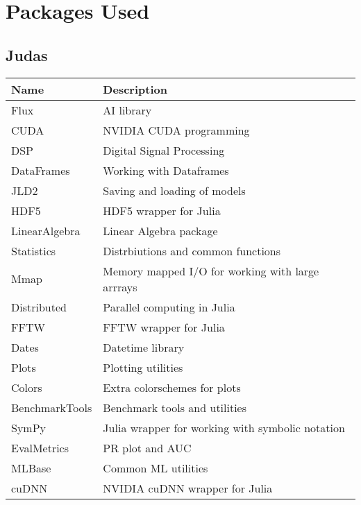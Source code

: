 \chapter{Packages Used}
\label{app:packages}

\section{Judas}
\label{app:jupacks}

\begin{table}[h]
\begin{tabular}{|l|l|}
\hline
\textbf{Name}  & \textbf{Description}                             \\ \hline
Flux           & AI library                                       \\ \hline
CUDA           & NVIDIA CUDA programming                          \\ \hline
DSP            & Digital Signal Processing                        \\ \hline
DataFrames     & Working with Dataframes                          \\ \hline
JLD2           & Saving and loading of models                     \\ \hline
HDF5           & HDF5 wrapper for Julia                           \\ \hline
LinearAlgebra  & Linear Algebra package                           \\ \hline
Statistics     & Distrbiutions and common functions               \\ \hline
Mmap           & Memory mapped I/O for working with large arrrays \\ \hline
Distributed    & Parallel computing in Julia                      \\ \hline
FFTW           & FFTW wrapper for Julia                           \\ \hline
Dates          & Datetime library                                 \\ \hline
Plots          & Plotting utilities                               \\ \hline
Colors         & Extra colorschemes for plots                     \\ \hline
BenchmarkTools & Benchmark tools and utilities                    \\ \hline
SymPy          & Julia wrapper for working with symbolic notation \\ \hline
EvalMetrics    & PR plot and AUC                                  \\ \hline
MLBase         & Common ML utilities                              \\ \hline
cuDNN          & NVIDIA cuDNN wrapper for Julia                   \\ \hline
\end{tabular}
\end{table}



